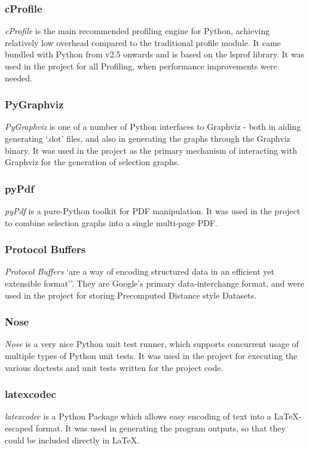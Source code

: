 \documentclass[a4paper,11pt]{report}
\begin{document}
\subsubsection*{cProfile}
\emph{cProfile} \citep{prog:cprofile} is the main recommended profiling engine for Python, achieving relatively low overhead compared to the traditional profile module. It came bundled with Python from v2.5 onwards and is based on the lsprof \citep{prog:lsprof} library. It was used in the project for all Profiling, when performance improvements were needed.

\subsubsection*{PyGraphviz}
\emph{PyGraphviz} \citep{prog:pygraphviz} is one of a number of Python interfaces to Graphviz - both in aiding generating `.dot' files, and also in generating the graphs through the Graphviz binary. It was used in the project as the primary mechanism of interacting with Graphviz for the generation of selection graphs. 

\subsubsection*{pyPdf}
\emph{pyPdf} \citep{prog:pypdf} is a pure-Python toolkit for PDF manipulation. It was used in the project to combine selection graphs into a single multi-page PDF.

\subsubsection*{Protocol Buffers}
\emph{Protocol Buffers} \citep{prog:protocolbuffers} `are a way of encoding structured data in an efficient yet extensible format''. They are Google's primary data-interchange format, and were used in the project for storing Precomputed Distance style Datasets.

\subsubsection*{Nose}
\emph{Nose} \citep{prog:nose} is a very nice Python unit test runner, which supports concurrent usage of multiple types of Python unit tests. It was used in the project for executing the various doctests and unit tests written for the project code.

\subsubsection*{latexcodec}
\emph{latexcodec} \citep{prog:latexcodec} is a Python Package which allows easy encoding of text into a \LaTeX{}-escaped format. It was used in generating the program outputs, so that they could be included directly in \LaTeX{}.
\end{document}

